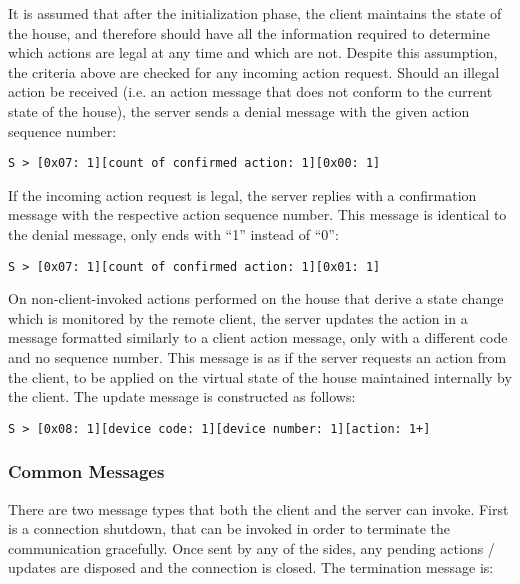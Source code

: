It is assumed that after the initialization phase, the client maintains the state of the house, and therefore should have all the information required to determine which actions are legal at any time and which are not. Despite this assumption, the criteria above are checked for any incoming action request.
Should an illegal action be received (i.e. an action message that does not conform to the current state of the house), the server sends a denial message with the given action sequence number:

\begin{verbatim}
S > [0x07: 1][count of confirmed action: 1][0x00: 1]
\end{verbatim}

\noindent
If the incoming action request is legal, the server replies with a confirmation message with the respective action sequence number. This message is identical to the denial message, only ends with ``1'' instead of ``0'':

\begin{verbatim}
S > [0x07: 1][count of confirmed action: 1][0x01: 1]
\end{verbatim}

\noindent
On non-client-invoked actions performed on the house that derive a state change which is monitored by the remote client, the server updates the action in a message formatted similarly to a client action message, only with a different code and no sequence number. This message is as if the server requests an action from the client, to be applied on the virtual state of the house maintained internally by the client. The update message is constructed as follows:

\begin{verbatim}
S > [0x08: 1][device code: 1][device number: 1][action: 1+]
\end{verbatim}



\subsubsection{Common Messages}
\label{sec:pdus:pdu:common}

There are two message types that both the client and the server can invoke. First is a connection shutdown, that can be invoked in order to terminate the communication gracefully. Once sent by any of the sides, any pending actions / updates are disposed and the connection is closed. The termination message is:

